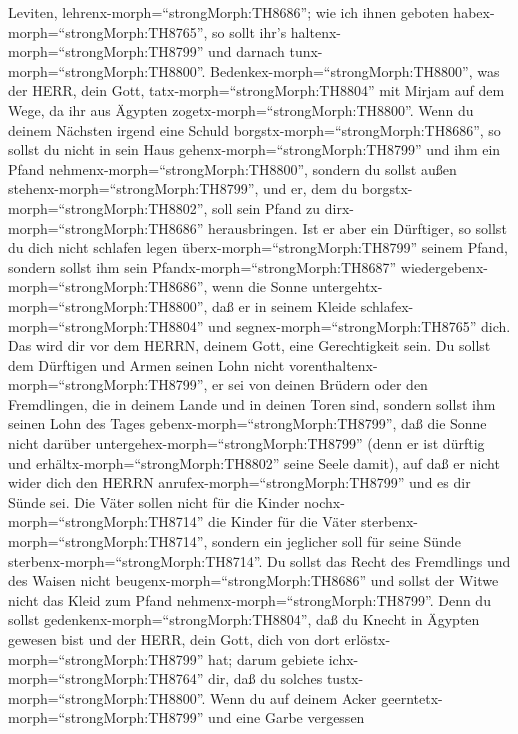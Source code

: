 Leviten, lehrenx-morph=``strongMorph:TH8686''; wie ich ihnen geboten
habex-morph=``strongMorph:TH8765'', so sollt ihr's
haltenx-morph=``strongMorph:TH8799'' und darnach
tunx-morph=``strongMorph:TH8800''. 
Bedenkex-morph=``strongMorph:TH8800'', was der HERR, dein Gott,
tatx-morph=``strongMorph:TH8804'' mit Mirjam auf dem Wege, da ihr aus
Ägypten zogetx-morph=``strongMorph:TH8800''.  Wenn du
deinem Nächsten irgend eine Schuld borgstx-morph=``strongMorph:TH8686'',
so sollst du nicht in sein Haus gehenx-morph=``strongMorph:TH8799'' und
ihm ein Pfand nehmenx-morph=``strongMorph:TH8800'', 
sondern du sollst außen stehenx-morph=``strongMorph:TH8799'', und er,
dem du borgstx-morph=``strongMorph:TH8802'', soll sein Pfand zu
dirx-morph=``strongMorph:TH8686'' herausbringen.  Ist er
aber ein Dürftiger, so sollst du dich nicht schlafen legen
überx-morph=``strongMorph:TH8799'' seinem Pfand,  sondern
sollst ihm sein Pfandx-morph=``strongMorph:TH8687''
wiedergebenx-morph=``strongMorph:TH8686'', wenn die Sonne
untergehtx-morph=``strongMorph:TH8800'', daß er in seinem Kleide
schlafex-morph=``strongMorph:TH8804'' und
segnex-morph=``strongMorph:TH8765'' dich. Das wird dir vor dem HERRN,
deinem Gott, eine Gerechtigkeit sein.  Du sollst dem
Dürftigen und Armen seinen Lohn nicht
vorenthaltenx-morph=``strongMorph:TH8799'', er sei von deinen Brüdern
oder den Fremdlingen, die in deinem Lande und in deinen Toren sind,
 sondern sollst ihm seinen Lohn des Tages
gebenx-morph=``strongMorph:TH8799'', daß die Sonne nicht darüber
untergehex-morph=``strongMorph:TH8799'' (denn er ist dürftig und
erhältx-morph=``strongMorph:TH8802'' seine Seele damit), auf daß er
nicht wider dich den HERRN anrufex-morph=``strongMorph:TH8799'' und es
dir Sünde sei.  Die Väter sollen nicht für die Kinder
nochx-morph=``strongMorph:TH8714'' die Kinder für die Väter
sterbenx-morph=``strongMorph:TH8714'', sondern ein jeglicher soll für
seine Sünde sterbenx-morph=``strongMorph:TH8714''.  Du
sollst das Recht des Fremdlings und des Waisen nicht
beugenx-morph=``strongMorph:TH8686'' und sollst der Witwe nicht das
Kleid zum Pfand nehmenx-morph=``strongMorph:TH8799''.  Denn
du sollst gedenkenx-morph=``strongMorph:TH8804'', daß du Knecht in
Ägypten gewesen bist und der HERR, dein Gott, dich von dort
erlöstx-morph=``strongMorph:TH8799'' hat; darum gebiete
ichx-morph=``strongMorph:TH8764'' dir, daß du solches
tustx-morph=``strongMorph:TH8800''.  Wenn du auf deinem
Acker geerntetx-morph=``strongMorph:TH8799'' und eine Garbe vergessen

